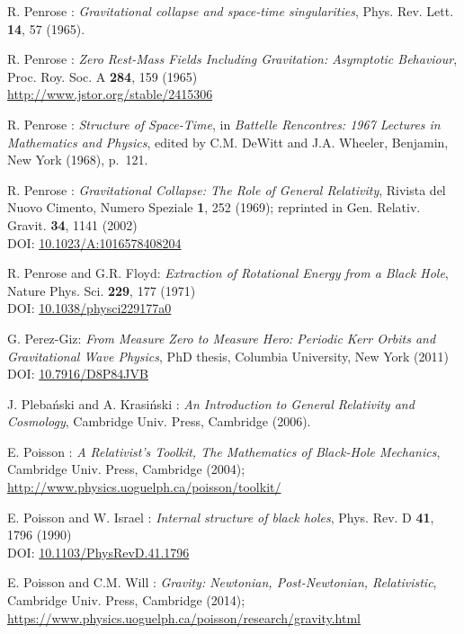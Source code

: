 \begin{thebibliography}{123}
R. Penrose : {\em Gravitational collapse and space-time singularities},
Phys. Rev. Lett. {\bf 14}, 57 (1965).

R. Penrose :
{\em Zero Rest-Mass Fields Including Gravitation: Asymptotic Behaviour},
Proc. Roy. Soc. A {\bf 284}, 159 (1965)\\
\url{http://www.jstor.org/stable/2415306}

R. Penrose : {\em Structure of Space-Time},
in {\em Battelle Rencontres: 1967 Lectures in Mathematics and Physics},
edited by C.M. DeWitt and J.A. Wheeler,
Benjamin, New York (1968), p.~121.

R. Penrose : {\em Gravitational Collapse: The Role of General Relativity},
Rivista del Nuovo Cimento, Numero Speziale {\bf 1}, 252 (1969); reprinted in
Gen. Relativ. Gravit. {\bf 34}, 1141 (2002)\\
DOI: \href{https://doi.org/10.1023/A:1016578408204}{10.1023/A:1016578408204}

R. Penrose and G.R. Floyd: {\em Extraction of Rotational Energy from
a Black Hole},  Nature Phys. Sci. {\bf 229}, 177 (1971)\\
DOI: \href{https://doi.org/10.1038/physci229177a0}{10.1038/physci229177a0}

G. Perez-Giz: {\em From Measure Zero to Measure Hero:
Periodic Kerr Orbits and Gravitational Wave Physics},
PhD thesis, Columbia University, New York (2011)\\
DOI: \href{https://doi.org/10.7916/D8P84JVB}{10.7916/D8P84JVB}

J. Pleba\'nski and A. Krasi\'nski :
{\em An Introduction to General Relativity and Cosmology},
Cambridge Univ. Press, Cambridge (2006).

E. Poisson : \emph{A Relativist's Toolkit,
The Mathematics of Black-Hole Mechanics},
Cambridge Univ. Press, Cambridge (2004); \\
\url{http://www.physics.uoguelph.ca/poisson/toolkit/}

E. Poisson and W. Israel : {\em Internal structure of black holes},
Phys. Rev. D {\bf 41}, 1796 (1990) \\
DOI: \href{https://doi.org/10.1103/PhysRevD.41.1796}{10.1103/PhysRevD.41.1796}

E. Poisson and C.M. Will : {\em Gravity: Newtonian, Post-Newtonian, Relativistic},
Cambridge Univ. Press, Cambridge (2014); \\
\url{https://www.physics.uoguelph.ca/poisson/research/gravity.html}


\end{thebibliography}
